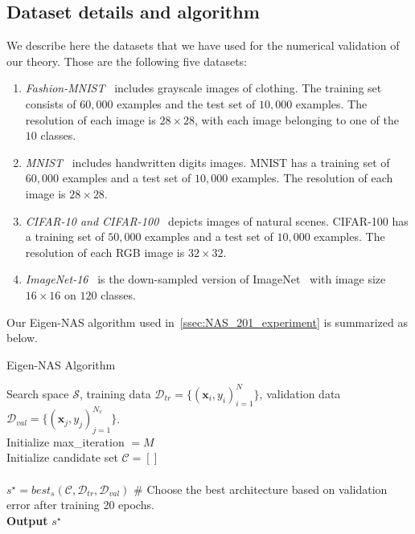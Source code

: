 \documentclass[nohyperref]{article}
\theoremstyle{plain}
\theoremstyle{definition}
\theoremstyle{remark}
\begin{document}
\subsection{Dataset details and algorithm}
\label{ssec:dataset}
We describe here the datasets that we have used for the numerical validation of our theory. Those are the following five datasets:

\begin{enumerate}
    \item \emph{Fashion-MNIST}~\citep{xiao2017fashion} includes grayscale images of clothing. The training set consists of $60,000$ examples and the test set of $10,000$ examples. The resolution of each image is $28\times 28$, with each image belonging to one of the $10$ classes. 

    \item \emph{MNIST}~\citep{726791} includes handwritten digits images. MNIST has a training set of $60,000$ examples and a test set of $10,000$ examples. The resolution of each image is $28\times 28$.

    \item \emph{CIFAR-10 and CIFAR-100~\citep{krizhevsky2014cifar}} depicts images of natural scenes. CIFAR-100 has a training set of $50,000$ examples and a test set of $10,000$ examples. The resolution of each RGB image is $32\times 32$.
    
    \item \emph{ImageNet-16}~\citep{chrabaszcz2017downsampled} is the down-sampled version of ImageNet~\citep{deng2009imagenet} with image size $16\times16$ on $120$ classes. 
\end{enumerate}



Our Eigen-NAS algorithm used in~\cref{ssec:NAS_201_experiment} is summarized as below.

\begin{algorithm}[H]
\caption{Eigen-NAS Algorithm}
\label{alg:algorithm_NAS}
\begin{algorithmic}
\REQUIRE Search space $\mathcal{S}$, training data $\mathcal{D}_{tr} = \{ (\bm x_i, y_i)_{i=1}^N \}$, validation data $\mathcal{D}_{val} = \{ (\bm x_j, y_j)_{j=1}^{N_v} \}$.\\
Initialize max\_iteration $ = M$\\
Initialize candidate set $\mathcal{C} = []$\\
\ENDFOR \\
$s^{\star} = best_{s}(\mathcal{C}, \mathcal{D}_{tr}, \mathcal{D}_{val})$ \# Choose the best architecture
based on validation error after training 20 epochs.\\
\textbf{Output} $s^{\star}$
\end{algorithmic}
\end{algorithm}
\end{document}
